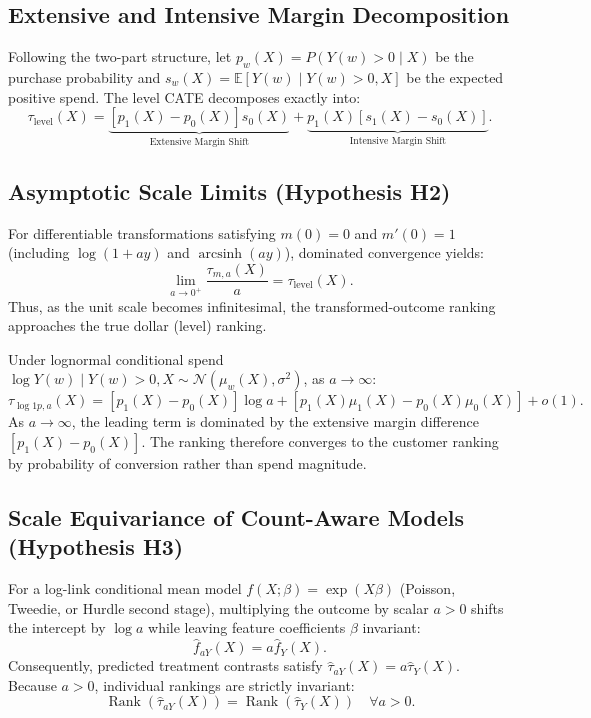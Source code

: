 \documentclass[11pt,a4paper]{article}
\newcommand{\taulevel}{\tau_{\text{level}}}
\newcommand{\tauma}{\tau_{m, a}}
\newcommand{\E}{\mathbb{E}}
\begin{document}
\subsection{Extensive and Intensive Margin Decomposition}
Following the two-part structure, let $p_w(X) = P(Y(w) > 0 \mid X)$ be the purchase probability and $s_w(X) = \E[Y(w) \mid Y(w) > 0, X]$ be the expected positive spend. The level CATE decomposes exactly into:
\begin{equation}
\boxed{\taulevel(X) = \underbrace{[p_1(X) - p_0(X)] s_0(X)}_{\text{Extensive Margin Shift}} + \underbrace{p_1(X) [s_1(X) - s_0(X)]}_{\text{Intensive Margin Shift}}.}
\end{equation}

\subsection{Asymptotic Scale Limits (Hypothesis H2)}
\begin{proposition}
For differentiable transformations satisfying $m(0) = 0$ and $m'(0) = 1$ (including $\log(1+ay)$ and $\operatorname{arcsinh}(ay)$), dominated convergence yields:
\begin{equation}
\lim_{a \to 0^+} \frac{\tauma(X)}{a} = \taulevel(X).
\end{equation}
Thus, as the unit scale becomes infinitesimal, the transformed-outcome ranking approaches the true dollar (level) ranking.
\end{proposition}

\begin{proposition}
Under lognormal conditional spend $\log Y(w) \mid Y(w)>0, X \sim \mathcal{N}(\mu_w(X), \sigma^2)$, as $a \to \infty$:
\begin{equation}
\tau_{\log 1p, a}(X) = [p_1(X) - p_0(X)] \log a + [p_1(X)\mu_1(X) - p_0(X)\mu_0(X)] + o(1).
\end{equation}
As $a \to \infty$, the leading term is dominated by the extensive margin difference $[p_1(X) - p_0(X)]$. The ranking therefore converges to the customer ranking by probability of conversion rather than spend magnitude.
\end{proposition}

\subsection{Scale Equivariance of Count-Aware Models (Hypothesis H3)}
For a log-link conditional mean model $f(X; \beta) = \exp(X\beta)$ (Poisson, Tweedie, or Hurdle second stage), multiplying the outcome by scalar $a > 0$ shifts the intercept by $\log a$ while leaving feature coefficients $\beta$ invariant:
\begin{equation}
\hat{f}_{aY}(X) = a \hat{f}_Y(X).
\end{equation}
Consequently, predicted treatment contrasts satisfy $\hat{\tau}_{aY}(X) = a \hat{\tau}_Y(X)$. Because $a > 0$, individual rankings are strictly invariant:
\begin{equation}
\operatorname{Rank}(\hat{\tau}_{aY}(X)) = \operatorname{Rank}(\hat{\tau}_Y(X)) \quad \forall a > 0.
\end{equation}
\end{document}
